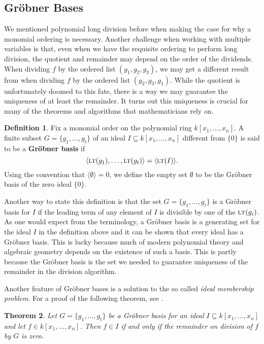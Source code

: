 \documentclass[MS, xcolor=dvipsnames]{wfuthesis}
\def\sbs{\subseteq}
\newcommand{\LT}{\ensuremath{\text{\sc lt}}}
\newtheorem{theorem}{Theorem}
\theoremstyle{definition}
\newtheorem{definition}[theorem]{Definition}
\begin{document}
\subsection{Gr\"obner Bases}
We mentioned polynomial long division before when making the case for why a monomial ordering is necessary. Another challenge when working with multiple variables is that, even when we have the requisite ordering to perform long division, the quotient and remainder may depend on the order of the dividends. When dividing $f$ by the ordered list $(g_1,g_2,g_3)$, we may get a different result from when dividing $f$ by the ordered list $(g_2,g_3,g_1)$. While the quotient is unfortunately doomed to this fate, there is a way we may guarantee the uniqueness of at least the remainder. It turns out this uniqueness is crucial for many of the theorems and algorithms that mathematicians rely on. \par
\begin{definition}
  Fix a monomial order on the polynomial ring $k[x_1,\dots,x_n]$. A finite subset $G = \{ g_1,\dots,g_t \}$ of an ideal $I \sbs k[x_1,\dots,x_n]$ different from $\{0\}$ is said to be a \textbf{Gr\"obner basis} if
  \[ \langle \LT(g_1), \dots, \LT(g_t) \rangle = \langle \LT(I) \rangle. \]
  Using the convention that $\langle \emptyset \rangle = {0}$, we define the empty set $\emptyset$ to be the Gr\"obner basis of the zero ideal $\{0\}$.
\end{definition}
Another way to state this definition is that the set $G = \{ g_1,\dots,g_t \}$ is a Gr\"obner basis for $I$ if the leading term of any element of $I$ is divisible by one of the $\LT(g_i)$. As one would expect from the terminology, a Gr\"obner basis is a generating set for the ideal $I$ in the definition above and it can be shown that every ideal has a Gr\"obner basis. This is lucky because much of modern polynomial theory and algebraic geometry depends on the existence of such a basis. This is partly because the Gr\"obner basis is the set we needed to guarantee uniqueness of the remainder in the division algorithm. \par
Another feature of Gr\"obner bases is a solution to the so called \emph{ideal membership problem}. For a proof of the following theorem, see \cite{Cox2015}.
\begin{theorem}
  Let $G = \{ g_1,\dots,g_t \}$ be a Gr\"obner basis for an ideal $I \sbs k[x_1,\dots,x_n]$ and let $f \in k[x_1,\dots,x_n]$. Then $f \in I$ if and only if the remainder on division of $f$ by $G$ is zero.
\end{theorem}
\end{document}
